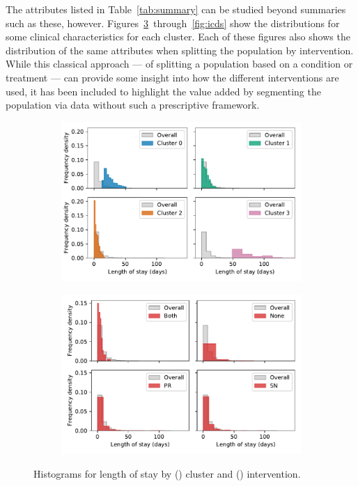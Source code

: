 \documentclass[11pt]{article}
\newlength{\imgwidth}
\begin{document}
The attributes listed in Table~\ref{tab:summary} can be studied beyond summaries
such as these, however. Figures~\ref{fig:los}~through~\ref{fig:icds} show the
distributions for some clinical characteristics for each cluster. Each of these
figures also shows the distribution of the same attributes when splitting the
population by intervention. While this classical approach --- of splitting a
population based on a condition or treatment --- can provide some insight into
how the different interventions are used, it has been included to highlight the
value added by segmenting the population via data without such a prescriptive
framework.

\begin{figure}
    \centering
    \begin{subfigure}{.5\imgwidth}
        \includegraphics[width=\linewidth]{img_cluster_true_los}
        \caption{}\label{fig:cluster_los}
    \end{subfigure}\hfill%
    \begin{subfigure}{.5\imgwidth}
        \includegraphics[width=\linewidth]{img_intervention_true_los}
        \caption{}\label{fig:intervention_los}
    \end{subfigure}
    \caption{%
        Histograms for length of stay by () cluster and
        () intervention.
    }\label{fig:los}
\end{figure}
\end{document}
